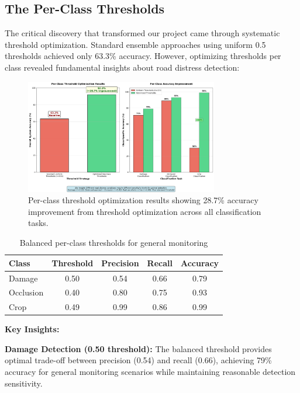 \documentclass[12pt]{article}
\begin{document}
\subsection{The Per-Class Thresholds}

The critical discovery that transformed our project came through systematic threshold optimization. Standard ensemble approaches using uniform 0.5 thresholds achieved only 63.3\% accuracy. However, optimizing thresholds per class revealed fundamental insights about road distress detection:

\begin{figure}[!htb]
\centering
\includegraphics[width=0.75\textwidth]{images/breakthrough_analysis.png}
\caption{Per-class threshold optimization results showing 28.7\% accuracy improvement from threshold optimization across all classification tasks.}
\end{figure}

\begin{table}[!h]
\centering
\begin{tabular}{lcccc}
\toprule
\textbf{Class} & \textbf{Threshold} & \textbf{Precision} & \textbf{Recall} & \textbf{Accuracy} \\
\midrule
Damage & 0.50 & 0.54 & 0.66 & 0.79 \\
Occlusion & 0.40 & 0.80 & 0.75 & 0.93 \\
Crop & 0.49 & 0.99 & 0.86 & 0.99 \\
\bottomrule
\end{tabular}
\caption{Balanced per-class thresholds for general monitoring}
\end{table}

\noindent\textbf{Key Insights:}

\textbf{Damage Detection (0.50 threshold):} The balanced threshold provides optimal trade-off between precision (0.54) and recall (0.66), achieving 79\% accuracy for general monitoring scenarios while maintaining reasonable detection sensitivity.
\end{document}

